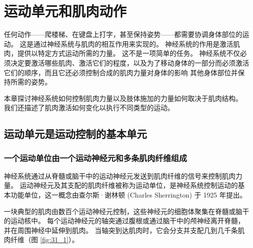 \chapter{运动单元和肌肉动作} \label{chap:chap31}

任何动作——爬楼梯、在键盘上打字，甚至保持姿势——都需要协调身体部位的运动。
这是通过神经系统与肌肉的相互作用来实现的。
神经系统的作用是激活肌肉，提供以特定方式运动所需的力量。
这不是一项简单的任务。
神经系统不仅必须决定要激活哪些肌肉、激活它们的程度，以及为了移动身体的一部分而必须激活它们的顺序，而且它还必须控制合成的肌肉力量对身体的影响 其他身体部位并保持所需的姿势。


本章探讨神经系统如何控制肌肉力量以及肢体施加的力量如何取决于肌肉结构。
我们还描述了肌肉激活如何变化以执行不同类型的运动。


\section{运动单元是运动控制的基本单元}

\subsection{一个运动单位由一个运动神经元和多条肌肉纤维组成}

神经系统通过从脊髓或脑干中的运动神经元发送到肌肉纤维的信号来控制肌肉力量。
运动神经元及其支配的肌肉纤维被称为运动单位，是神经系统控制运动的基本功能单位，这一概念由查尔斯·谢林顿 (Charles Sherrington) 于 1925 年提出。


一块典型的肌肉由数百个运动神经元控制，这些神经元的细胞体聚集在脊髓或脑干的运动核中。
每个运动神经元的轴突通过腹根或通过脑干中的颅神经离开脊髓，并在周围神经中延伸到肌肉。
当轴突到达肌肉时，它会分支并支配几到几千条肌肉纤维（图 \ref{fig:31_1}）。


